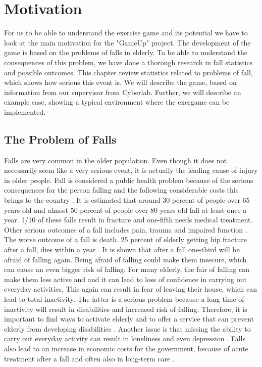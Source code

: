 \chapter{Motivation}
For us to be able to understand the exercise game and its potential we have to look at the main motivation for the "GameUp" project. The development of the game is based on the problems of falls in elderly. To be able to understand the consequences of this problem, we have done a thorough research in fall statistics and possible outcomes. This chapter review statistics related to problems of fall, which shows how serious this event is. We will describe the game, based on information from our supervisor from Cyberlab. Further, we will describe an example case, showing a typical environment where the exergame can be implemented.  
\section{The Problem of Falls}
Falls are very common in the older population. Even though it does not necessarily seem like a very serious event, it is actually the leading cause of injury in older people.  Fall is considered a public health problem because of the serious consequences for the person falling and the following considerable costs this brings to the country \cite{otago}.
It is estimated that around 30 percent of people over 65 years old and almost 50 percent of people over 80 years old fall at least once a year. 1/10 of these falls result in fracture and one-fifth needs medical treatment. Other serious outcomes of a fall includes pain, trauma and impaired function \cite{otago}.  The worse outcome of a fall is death. 25 percent of elderly getting hip fracture after a fall, dies within a year \cite{gruppetrening-trheim} \cite{larhalsbrudd}. It is shown that after a fall one-third will be afraid of falling again. Being afraid of falling could make them insecure, which can cause an even bigger risk of falling. For many elderly, the fair of falling can make them less active and and it can lead to loss of confidence in carrying out everyday activities. This again can result in fear of leaving their house, which can lead to total inactivity. The latter is a serious problem because a long time of inactivity will result in disabilities and increased risk of falling. Therefore, it is important to find ways to activate elderly and to offer a service that can prevent elderly from developing disabilities \cite{gruppetrening-trheim}. Another issue is that missing the ability to carry out everyday activity can result in loneliness and even depression \cite{exergamesforelderly}. Falls also lead to an increase in economic costs for the government, because of acute treatment after a fall and often also in long-term care \cite{otago}.\\ \\

